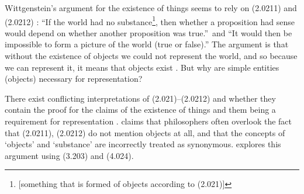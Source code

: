 \documentclass{article}
\newcommand{\prop}[1]{(#1)}
\begin{document}
Wittgenstein's argument for the existence of things seems to rely on \prop{2.0211} and \prop{2.0212} \cite{Sp2007}: ``If the world had no substance\footnote{[something that is formed of objects according to \prop{2.021}]}, then whether a proposition had sense would depend on whether another proposition was true.''\ and ``It would then be impossible to form a picture of the world (true or false).''
The argument is that without the existence of objects we could not represent the world, and so because we can represent it, it means that objects exist \cite{Sp2007}.
But why are simple entities (objects) necessary for representation?

There exist conflicting interpretations of \prop{2.021}--\prop{2.0212} and whether they contain the proof for the claims of the existence of things and them being a requirement for representation \cite{Lu1976, Gr1964, We1935, An1959, Pi1964}. 
\cite{Lu1976} claims that philosophers often overlook the fact that \prop{2.0211}, \prop{2.0212} do not mention objects at all, and that the concepts of `objects' and `substance' are incorrectly treated as synonymous.
\cite{Sp2007} explores this argument using \prop{3.203} and \prop{4.024}.

\printbibliography[title=References]
\end{document}

